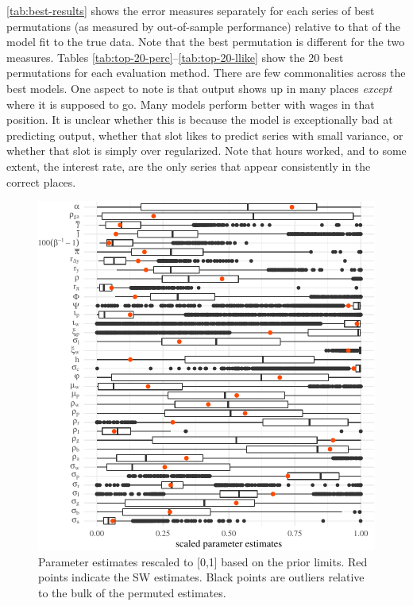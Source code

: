 \documentclass[11pt]{article}
\begin{document}
\autoref{tab:best-results} shows the error measures separately for each
series of best permutations (as measured by out-of-sample performance)
relative to that of the model fit to the true data. Note that the best
permutation is different for the two measures. Tables
\ref{tab:top-20-perc}--\ref{tab:top-20-llike} show the 20 best
permutations for each evaluation method. There are few commonalities
across the best models. One aspect to note is that output shows up in
many places \emph{except} where it is supposed to go. Many models
perform better with wages in that position. It is unclear whether this
is because the model is exceptionally bad at predicting output, whether
that slot likes to predict series with small variance, or whether that
slot is simply over regularized. Note that hours worked, and to some
extent, the interest rate, are the only series that appear consistently
in the correct places.

\begin{figure}[t]

{\centering \includegraphics{gfx/scaled-parameter-boxplots-1} 

}

\caption{Parameter estimates rescaled to [0,1] based on the prior limits. Red points indicate the SW estimates. Black points are outliers relative to the bulk of the permuted estimates.}\label{fig:scaled-parameter-boxplots}
\end{figure}
\end{document}
